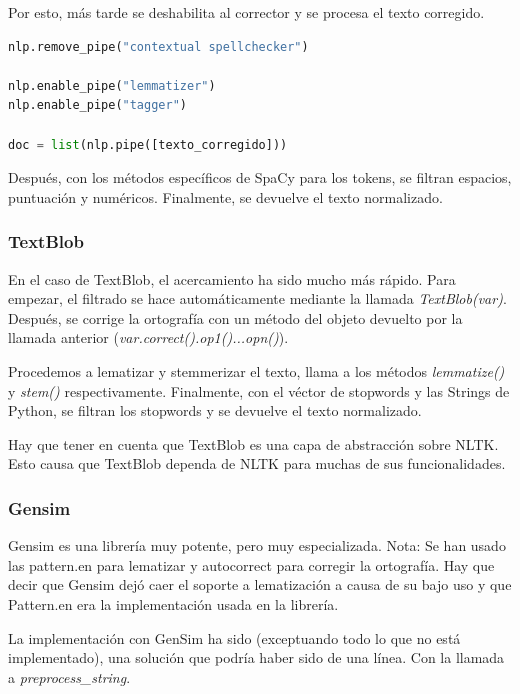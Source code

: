\documentclass[a4paper,twocolumn]{article}
\begin{document}
    Por esto, más tarde se deshabilita al corrector y se procesa el texto corregido.

    \begin{lstlisting}[language=Python,label={lst:codigoSpellSpacy2},basicstyle=\scriptsize]
nlp.remove_pipe("contextual spellchecker")

nlp.enable_pipe("lemmatizer")
nlp.enable_pipe("tagger")

doc = list(nlp.pipe([texto_corregido]))
    \end{lstlisting}

    Después, con los métodos específicos de SpaCy para los tokens, se filtran espacios, puntuación y numéricos.
    Finalmente, se devuelve el texto normalizado.

    \subsubsection{TextBlob}\label{subsubsec:textblob_impl}
    En el caso de TextBlob, el acercamiento ha sido mucho más rápido.
    Para empezar, el filtrado se hace automáticamente mediante la llamada \textit{TextBlob(var)}.
    Después, se corrige la ortografía con un método del objeto devuelto por la llamada anterior (\textit{var.correct().op1()...opn()}).

    Procedemos a lematizar y stemmerizar el texto, llama a los métodos \textit{lemmatize()} y \textit{stem()} respectivamente.
    Finalmente, con el véctor de stopwords y las Strings de Python, se filtran los stopwords y se devuelve el texto normalizado.

    Hay que tener en cuenta que TextBlob es una capa de abstracción sobre NLTK\@.
    Esto causa que TextBlob dependa de NLTK para muchas de sus funcionalidades.

    \subsubsection{Gensim}\label{subsubsec:gensim_impl}
    Gensim es una librería muy potente, pero muy especializada.
    Nota: Se han usado las pattern.en para lematizar y autocorrect para corregir la ortografía.
    Hay que decir que Gensim dejó caer el soporte a lematización a causa de su bajo uso y que Pattern.en era la implementación usada en la librería.

    La implementación con GenSim ha sido (exceptuando todo lo que no está implementado),
    una solución que podría haber sido de una línea.
    Con la llamada a \textit{preprocess\_string}.
\end{document}
